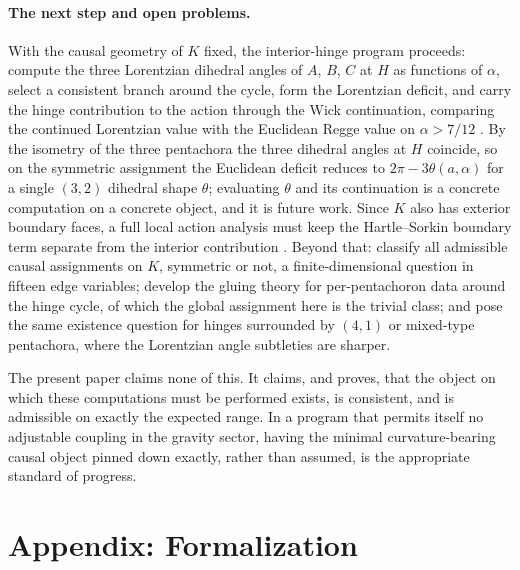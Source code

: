 \documentclass[11pt]{article}
\theoremstyle{definition}
\theoremstyle{remark}
\newcommand{\Kmin}{K}
\begin{document}
\paragraph{The next step and open problems.}
With the causal geometry of $\Kmin$ fixed, the interior-hinge program proceeds: compute the three Lorentzian dihedral angles of $A$, $B$, $C$ at $H$ as functions of $\alpha$, select a consistent branch around the cycle, form the Lorentzian deficit, and carry the hinge contribution to the action through the Wick continuation, comparing the continued Lorentzian value with the Euclidean Regge value on $\alpha>7/12$ \cite{Regge,HartleSorkin,ReggeWilliams}. By the isometry of the three pentachora the three dihedral angles at $H$ coincide, so on the symmetric assignment the Euclidean deficit reduces to $2\pi-3\theta(a,\alpha)$ for a single $(3,2)$ dihedral shape $\theta$; evaluating $\theta$ and its continuation is a concrete computation on a concrete object, and it is future work. Since $\Kmin$ also has exterior boundary faces, a full local action analysis must keep the Hartle--Sorkin boundary term separate from the interior contribution \cite{HartleSorkin}. Beyond that: classify all admissible causal assignments on $\Kmin$, symmetric or not, a finite-dimensional question in fifteen edge variables; develop the gluing theory for per-pentachoron data around the hinge cycle, of which the global assignment here is the trivial class; and pose the same existence question for hinges surrounded by $(4,1)$ or mixed-type pentachora, where the Lorentzian angle subtleties are sharper.

The present paper claims none of this. It claims, and proves, that the object on which these computations must be performed exists, is consistent, and is admissible on exactly the expected range. In a program that permits itself no adjustable coupling in the gravity sector, having the minimal curvature-bearing causal object pinned down exactly, rather than assumed, is the appropriate standard of progress.

\appendix

\section*{Appendix: Formalization}
\label{app:formal}
\end{document}
